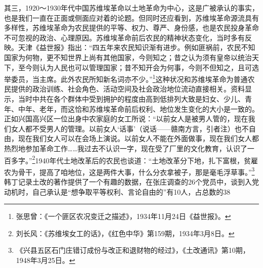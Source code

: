 其三，1920～1930年代中国苏维埃革命以土地革命为中心，这是广被承认的事实，也是我们一直在正面或侧面应对着的论题。但同时还应看到，苏维埃革命源流具有多样性，苏维埃革命为农民提供的平等、权力、尊严、身份感，也是农民投身革命不可忽视的政治、心理原因。苏维埃革命前后农民的精神状态变化，当时多有反映。天津《益世报》指出：“四五年来农民知识渐有进步。例如匪祸前，农民不知国家为何物，更不知世界上尚有其他国家，今则知之；昔之认为须有皇帝以统治天下，至今则认为人民也可以管理国家；昔不知开会为何事，今则不但知之，且可选举委员，当主席。此外农民所知新名词亦不少。”\footnote{张思曾：《一个匪区农况变迁之描述》，1934年11月24日《益世报》。}这种状况和苏维埃革命为普通农民提供的政治训练、社会角色、活动空间及社会政治地位流动直接相关。资料显示，当时中共在各个群体中受到拥护的程度由高到低排列大致是妇女、少儿、青年、中年、老年，而这恰和苏维埃革命前后权利、地位发生变化的大小是一致的。正如兴国高兴区一位出身中农家庭的女工所说：“以前女人是被男人管的，现在我们女人都不受男人的管理。以前女人‘话事’（说话——赣南方言，引者注）也不自由，现在我们女人可以在会场上演说。以前女人不能在外面做事，现在我们女人都热烈地参加革命工作……我过去不认识一字，现在受了厂里的文化教育，认识了一百多字。”\footnote{刘长风：《苏维埃女工的话》，《红色中华》第159期，1934年3月8日。}1940年代土地改革后的农民也谈道：“土地改革分下地，扎下富根，贫雇农为骨干，提高了咱地位，这是两件大事，什么分衣拿被子，那是毫毛浮草事。”\footnote{《兴县五区石门庄错订成份与改正和退财物的经过》，《土改通讯》第10期，1948年3月25日。}韩丁记录土改的著作提供了一个有趣的数据，在张庄调查的26个党员中，谈到入党动机时，自己承认是“想争取平等权利、言论自由的”有10人，占总数的38%


